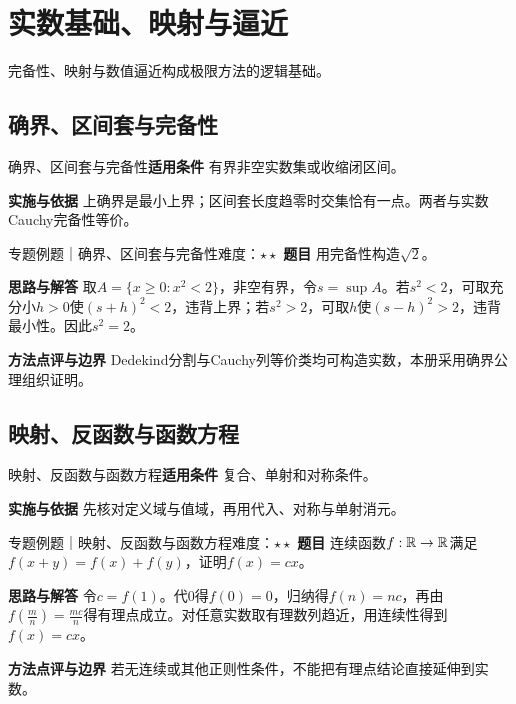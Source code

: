 \section{实数基础、映射与逼近}\label{mat:real_foundations}
\begin{examtip}完备性、映射与数值逼近构成极限方法的逻辑基础。\end{examtip}
\subsection{确界、区间套与完备性}\label{mat:real_foundations:complete}
\begin{method}{确界、区间套与完备性}\textbf{适用条件} 有界非空实数集或收缩闭区间。\par\textbf{实施与依据} 上确界是最小上界；区间套长度趋零时交集恰有一点。两者与实数Cauchy完备性等价。\end{method}
\begin{example}{专题例题｜确界、区间套与完备性}{难度：$\star\star$}
\textbf{题目} 用完备性构造$\sqrt2$。\par\textbf{思路与解答} 取$A=\{x\ge0:x^2<2\}$，非空有界，令$s=\sup A$。若$s^2<2$，可取充分小$h>0$使$(s+h)^2<2$，违背上界；若$s^2>2$，可取$h$使$(s-h)^2>2$，违背最小性。因此$s^2=2$。\par\textbf{方法点评与边界} Dedekind分割与Cauchy列等价类均可构造实数，本册采用确界公理组织证明。
\end{example}
\subsection{映射、反函数与函数方程}\label{mat:real_foundations:mapping}
\begin{method}{映射、反函数与函数方程}\textbf{适用条件} 复合、单射和对称条件。\par\textbf{实施与依据} 先核对定义域与值域，再用代入、对称与单射消元。\end{method}
\begin{example}{专题例题｜映射、反函数与函数方程}{难度：$\star\star$}
\textbf{题目} 连续函数$f:\mathbb{R}\to\mathbb{R}$满足$f(x+y)=f(x)+f(y)$，证明$f(x)=cx$。\par\textbf{思路与解答} 令$c=f(1)$。代0得$f(0)=0$，归纳得$f(n)=nc$，再由$f(\frac{m}{n})=\frac{mc}{n}$得有理点成立。对任意实数取有理数列趋近，用连续性得到$f(x)=cx$。\par\textbf{方法点评与边界} 若无连续或其他正则性条件，不能把有理点结论直接延伸到实数。
\end{example}
